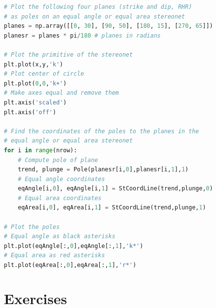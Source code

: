 \documentclass[a4paper , 12pt]{book}
\begin{document}
\begin{center}
\begin{lstlisting}[language=Python, frame=single]
# Plot the following four planes (strike and dip, RHR)
# as poles on an equal angle or equal area stereonet
planes = np.array([[0, 30], [90, 50], [180, 15], [270, 65]])
planesr = planes * pi/180 # planes in radians

# Plot the primitive of the stereonet
plt.plot(x,y,'k')
# Plot center of circle
plt.plot(0,0,'k+')
# Make axes equal and remove them
plt.axis('scaled')
plt.axis('off')

# Find the coordinates of the poles to the planes in the
# equal angle or equal area stereonet
for i in range(nrow):
    # Compute pole of plane
    trend, plunge = Pole(planesr[i,0],planesr[i,1],1)
    # Equal angle coordinates
    eqAngle[i,0], eqAngle[i,1] = StCoordLine(trend,plunge,0) 
    # Equal area coordinates
    eqArea[i,0], eqArea[i,1] = StCoordLine(trend,plunge,1)

# Plot the poles
# Equal angle as black asterisks
plt.plot(eqAngle[:,0],eqAngle[:,1],'k*')
# Equal area as red asterisks
plt.plot(eqArea[:,0],eqArea[:,1],'r*')
\end{lstlisting}
\end{center}

\section{Exercises}
\end{document}
